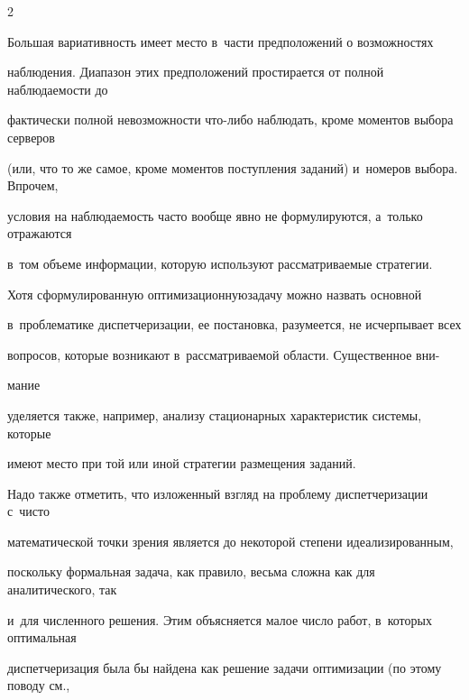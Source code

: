 \begin{multicols}{2}
    


    Большая вариативность имеет место в~части предположений о возможностях 


наблюдения. Диапазон этих предположений простирается от полной наблюдаемости до 


фактически полной невозможности что-либо наблюдать, кроме моментов выбора серверов 


(или, что то же самое, кроме моментов поступления заданий) и~номеров выбора. Впрочем, 


условия на наблюдаемость часто вообще явно не формулируются, а~только отражаются 


в~том объеме информации, которую используют рассматри\-ва\-емые стратегии.


    


    Хотя сформулированную оптимизационную\linebreak задачу можно назвать основной 


в~проблематике диспетчеризации, ее постановка, разумеется, не ис\-черпывает всех 


вопросов, которые возникают в~рассматриваемой области. Существенное вни-\linebreak\vspace*{-12pt}





\columnbreak





\noindent


мание 


уделяется также, например, анализу стационарных характеристик системы, которые 


имеют место при той или иной стратегии размещения заданий.


    


    Надо также отметить, что изложенный взгляд на проблему диспетчеризации с~чисто 


математической точки зрения является до некоторой степени идеализированным, 


поскольку формальная задача, как правило, весьма сложна как для аналитического, так 


и~для численного решения. Этим объясняется малое число работ, в~которых оптимальная 


диспетчеризация была бы найдена как решение задачи оптимизации (по этому поводу см., 



\end{multicols}
